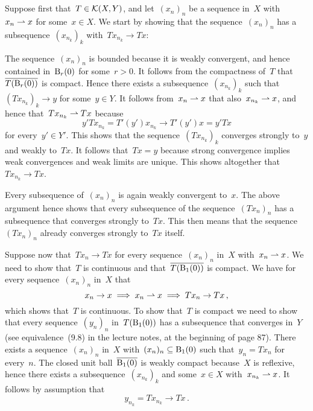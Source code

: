 \section{}

Suppose first that~$T \in \mathcal{K}(X,Y)$, and let~$(x_n)_n$ be a sequence in~$X$ with~$x_n \rightharpoonup x$ for some~$x \in X$.
We start by showing that the sequence~$(x_n)_n$ has a subsequence~$(x_{n_k})_k$ with~$T x_{n_k} \to T x$:

The sequence~$(x_n)_n$ is bounded because it is weakly convergent, and hence contained in~$\operatorname{B}_{r}(0)$ for some~$r > 0$.
It follows from the compactness of~$T$ that~$\overline{ T( \operatorname{B}_{r}(0) ) }$ is compact.
Hence there exists a subsequence~$(x_{n_k})_k$ such that~$( T x_{n_k} )_k \to y$ for some~$y \in Y$.
It follows from~$x_n \rightharpoonup x$ that also~$x_{n_k} \rightharpoonup x$, and hence that~$T x_{n_k} \rightharpoonup T x$ because
\[
  y' T x_{n_k}
  =
  T'(y') x_{n_k}
  \to
  T'(y') x
  =
  y' T x
\]
for every~$y' \in Y'$.
This shows that the sequence~$(T x_{n_k})_k$ converges strongly to~$y$ and weakly to~$T x$.
It follows that~$Tx = y$ because strong convergence implies weak convergences and weak limits are unique.
This shows altogether that~$T x_{n_k} \to T x$.

Every subsequence of~$(x_n)_n$ is again weakly convergent to~$x$.
The above argument hence shows that every subsequence of the sequence~$(T x_n)_n$ has a subsequence that converges strongly to~$T x$.
This then means that the sequence~$(T x_n)_n$ already converges strongly to~$T x$ itself.

Suppose now that~$T x_n \to Tx$ for every sequence~$(x_n)_n$ in~$X$ with~$x_n \rightharpoonup x$.
We need to show that~$T$ is continuous and that~$\overline{ T( \operatorname{B}_{1}(0) ) }$ is compact.
We have for every sequence~$(x_n)_n$ in~$X$ that
\[
  x_n \to x
  \implies
  x_n \rightharpoonup x
  \implies
  T x_n \to T x \,,
\]
which shows that~$T$ is continuous.
To show that~$T$ is compact we need to show that every sequence~$(y_n)_n$ in~$T( \operatorname{B}_{1}(0) )$ has a subsequence that converges in~$Y$ (see equivalence~(9.8) in the lecture notes, at the beginning of page 87).
There exists a sequence~$(x_n)_n$ in~$X$ with~$(x_n)_n \subseteq \operatorname{B}_{1}(0)$ such that~$y_n = T x_n$ for every~$n$.
The closed unit ball~$\overline{\operatorname{B}_{1}(0)}$ is weakly compact because~$X$ is reflexive, hence there exists a subsequence~$(x_{n_k})_k$ and some~$x \in X$ with~$x_{n_k} \rightharpoonup x$.
It follows by assumption that
\[
  y_{n_k}
  =
  T x_{n_k}
  \to
  T x \,.
\]



